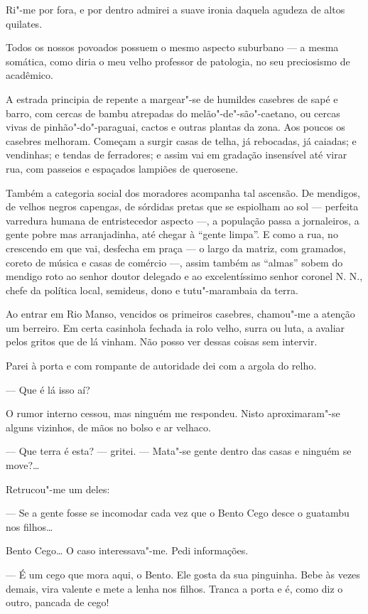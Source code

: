 Ri"-me por fora, e por dentro admirei a suave ironia daquela agudeza de
altos quilates.

Todos os nossos povoados possuem o mesmo aspecto suburbano --- a mesma
somática, como diria o meu velho professor de patologia, no seu
preciosismo de acadêmico.

A estrada principia de repente a margear"-se de humildes casebres de sapé
e barro, com cercas de bambu atrepadas do melão"-de"-são"-caetano, ou
cercas vivas de pinhão"-do"-paraguai, cactos e outras plantas da zona. Aos
poucos os casebres melhoram. Começam a surgir casas de telha, já
rebocadas, já caiadas; e vendinhas; e tendas de ferradores; e assim vai
em gradação insensível até virar rua, com passeios e espaçados lampiões
de querosene.

Também a categoria social dos moradores acompanha tal ascensão. De
mendigos, de velhos negros capengas, de sórdidas pretas que se espiolham
ao sol --- perfeita varredura humana de entristecedor aspecto ---, a
população passa a jornaleiros, a gente pobre mas arranjadinha, até
chegar à ``gente limpa''. E como a rua, no crescendo em que vai,
desfecha em praça --- o largo da matriz, com gramados, coreto de música
e casas de comércio ---, assim também as ``almas'' sobem do mendigo roto
ao senhor doutor delegado e ao excelentíssimo senhor coronel N. N.,
chefe da política local, semideus, dono e tutu"-marambaia da terra.

Ao entrar em Rio Manso, vencidos os primeiros casebres, chamou"-me a
atenção um berreiro. Em certa casinhola fechada ia rolo velho, surra ou
luta, a avaliar pelos gritos que de lá vinham. Não posso ver dessas
coisas sem intervir.

Parei à porta e com rompante de autoridade dei com a argola do relho.

--- Que é lá isso aí?

O rumor interno cessou, mas ninguém me respondeu. Nisto aproximaram"-se
alguns vizinhos, de mãos no bolso e ar velhaco.

--- Que terra é esta? --- gritei. --- Mata"-se gente dentro das casas e
ninguém se move?\ldots{}

Retrucou"-me um deles:

--- Se a gente fosse se incomodar cada vez que o Bento Cego desce o
guatambu nos filhos\ldots{}

Bento Cego\ldots{} O caso interessava"-me. Pedi informações.

--- É um cego que mora aqui, o Bento. Ele gosta da sua pinguinha. Bebe
às vezes demais, vira valente e mete a lenha nos filhos. Tranca a porta
e é, como diz o outro, pancada de cego!

